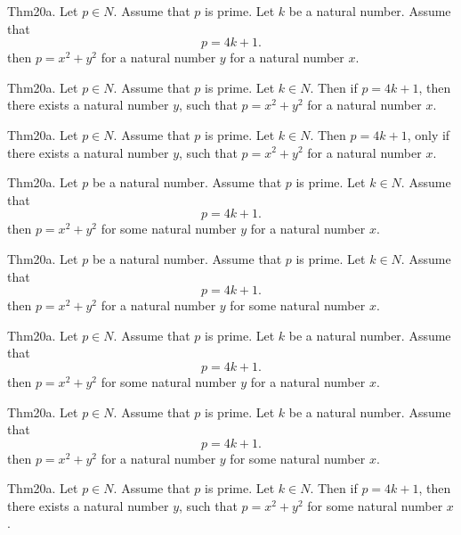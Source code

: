 \documentclass{article}
\begin{document}
Thm20a. Let $p \in N$. Assume that $p$ is prime. Let $k$ be a natural number. Assume that $$p = 4 k + 1.$$ then $p = x ^{ 2}+ y ^{ 2}$ for a natural number $y$ for a natural number $x$.

Thm20a. Let $p \in N$. Assume that $p$ is prime. Let $k \in N$. Then if $p = 4 k + 1$, then there exists a natural number $y$, such that $p = x ^{ 2}+ y ^{ 2}$ for a natural number $x$.

Thm20a. Let $p \in N$. Assume that $p$ is prime. Let $k \in N$. Then $p = 4 k + 1$, only if there exists a natural number $y$, such that $p = x ^{ 2}+ y ^{ 2}$ for a natural number $x$.

Thm20a. Let $p$ be a natural number. Assume that $p$ is prime. Let $k \in N$. Assume that $$p = 4 k + 1.$$ then $p = x ^{ 2}+ y ^{ 2}$ for some natural number $y$ for a natural number $x$.

Thm20a. Let $p$ be a natural number. Assume that $p$ is prime. Let $k \in N$. Assume that $$p = 4 k + 1.$$ then $p = x ^{ 2}+ y ^{ 2}$ for a natural number $y$ for some natural number $x$.

Thm20a. Let $p \in N$. Assume that $p$ is prime. Let $k$ be a natural number. Assume that $$p = 4 k + 1.$$ then $p = x ^{ 2}+ y ^{ 2}$ for some natural number $y$ for a natural number $x$.

Thm20a. Let $p \in N$. Assume that $p$ is prime. Let $k$ be a natural number. Assume that $$p = 4 k + 1.$$ then $p = x ^{ 2}+ y ^{ 2}$ for a natural number $y$ for some natural number $x$.

Thm20a. Let $p \in N$. Assume that $p$ is prime. Let $k \in N$. Then if $p = 4 k + 1$, then there exists a natural number $y$, such that $p = x ^{ 2}+ y ^{ 2}$ for some natural number $x$.
\end{document}
